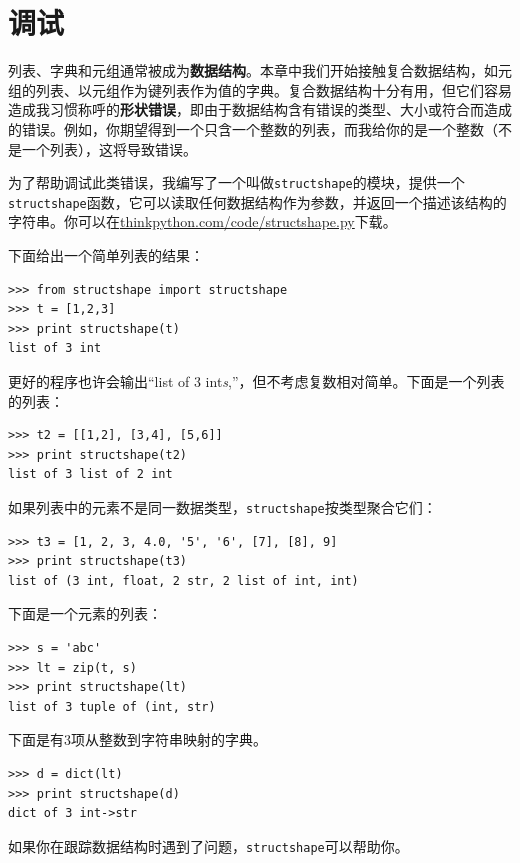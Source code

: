 

\section{调试}

列表、字典和元组通常被成为{\bf 数据结构}。本章中我们开始接触复合数据结构，如元组的列表、以元组作为键列表作为值的字典。复合数据结构十分有用，但它们容易造成我习惯称呼的{\bf 形状错误}，即由于数据结构含有错误的类型、大小或符合而造成的错误。例如，你期望得到一个只含一个整数的列表，而我给你的是一个整数（不是一个列表），这将导致错误。


为了帮助调试此类错误，我编写了一个叫做{\tt structshape}的模块，提供一个{\tt structshape}函数，它可以读取任何数据结构作为参数，并返回一个描述该结构的字符串。你可以在\url{thinkpython.com/code/structshape.py}下载。

下面给出一个简单列表的结果：

\beforeverb
\begin{verbatim}
>>> from structshape import structshape
>>> t = [1,2,3]
>>> print structshape(t)
list of 3 int
\end{verbatim}
\afterverb
%
更好的程序也许会输出``list of 3 int{\em s},''，但不考虑复数相对简单。下面是一个列表的列表：

\beforeverb
\begin{verbatim}
>>> t2 = [[1,2], [3,4], [5,6]]
>>> print structshape(t2)
list of 3 list of 2 int
\end{verbatim}
\afterverb
%
如果列表中的元素不是同一数据类型，{\tt structshape}按类型聚合它们：

\beforeverb
\begin{verbatim}
>>> t3 = [1, 2, 3, 4.0, '5', '6', [7], [8], 9]
>>> print structshape(t3)
list of (3 int, float, 2 str, 2 list of int, int)
\end{verbatim}
\afterverb
%
下面是一个元素的列表：

\beforeverb
\begin{verbatim}
>>> s = 'abc'
>>> lt = zip(t, s)
>>> print structshape(lt)
list of 3 tuple of (int, str)
\end{verbatim}
\afterverb
%
下面是有3项从整数到字符串映射的字典。

\beforeverb
\begin{verbatim}
>>> d = dict(lt) 
>>> print structshape(d)
dict of 3 int->str
\end{verbatim}
\afterverb
%
如果你在跟踪数据结构时遇到了问题，{\tt structshape}可以帮助你。


